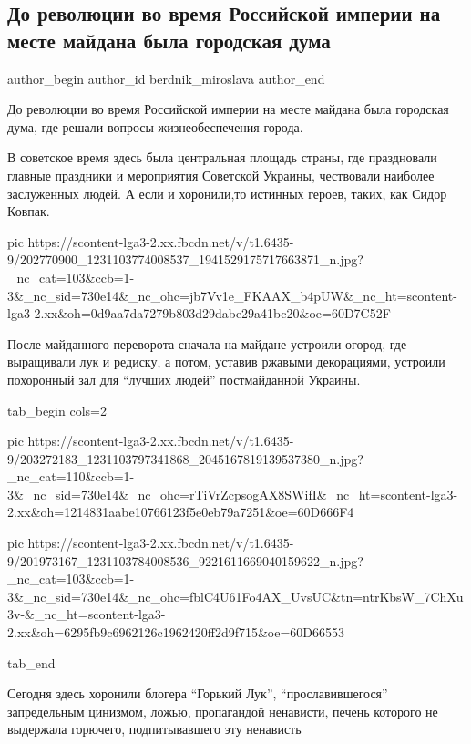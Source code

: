  
 
 
 
 
 
\subsection{До революции во время Российской империи на месте майдана была городская дума}
\label{sec:22_06_2021.fb.berdnik_miroslava.1.maidan_kiev_rusimperia_istoria}
\ifcmt
 author_begin
   author_id berdnik_miroslava
 author_end
\fi

До революции во время Российской империи на месте майдана была городская дума,
где решали вопросы жизнеобеспечения города.

В советское время здесь была центральная площадь страны, где праздновали
главные праздники и мероприятия Советской Украины, чествовали наиболее
заслуженных людей. А если и хоронили,то истинных героев, таких, как Сидор
Ковпак.

\ifcmt
  pic https://scontent-lga3-2.xx.fbcdn.net/v/t1.6435-9/202770900_1231103774008537_1941529175717663871_n.jpg?_nc_cat=103&ccb=1-3&_nc_sid=730e14&_nc_ohc=jb7Vv1e_FKAAX_b4pUW&_nc_ht=scontent-lga3-2.xx&oh=0d9aa7da7279b803d29dabe29a41bc20&oe=60D7C52F
\fi

После майданного переворота сначала на майдане устроили огород, где выращивали
лук и редиску, а потом, уставив ржавыми декорациями, устроили похоронный зал
для \enquote{лучших людей} постмайданной Украины. 


\ifcmt
  tab_begin cols=2

     pic https://scontent-lga3-2.xx.fbcdn.net/v/t1.6435-9/203272183_1231103797341868_2045167819139537380_n.jpg?_nc_cat=110&ccb=1-3&_nc_sid=730e14&_nc_ohc=rTiVrZcpsogAX8SWifI&_nc_ht=scontent-lga3-2.xx&oh=1214831aabe10766123f5e0eb79a7251&oe=60D666F4

     pic https://scontent-lga3-2.xx.fbcdn.net/v/t1.6435-9/201973167_1231103784008536_9221611669040159622_n.jpg?_nc_cat=103&ccb=1-3&_nc_sid=730e14&_nc_ohc=fblC4U61Fo4AX_UvsUC&tn=ntrKbsW_7ChXu3v-&_nc_ht=scontent-lga3-2.xx&oh=6295fb9c6962126c1962420ff2d9f715&oe=60D66553

  tab_end
\fi

Сегодня здесь хоронили блогера \enquote{Горький Лук}, \enquote{прославившегося} запредельным
цинизмом, ложью, пропагандой ненависти, печень которого не выдержала горючего,
подпитывавшего эту ненависть
